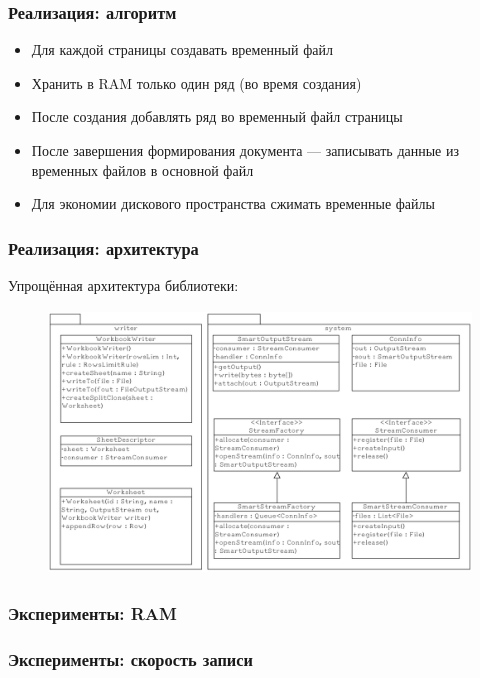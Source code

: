 \documentclass{beamer}
\begin{document}
\begin{frame}\frametitle{Реализация: алгоритм}
\begin{itemize}
    \item Для каждой страницы создавать временный файл
    \item Хранить в RAM только один ряд (во время создания)
    \item После создания добавлять ряд во временный файл страницы
    \item После завершения формирования документа --- записывать данные из временных файлов в основной файл
    \item Для экономии дискового пространства сжимать временные файлы
\end{itemize}
\end{frame}

\begin{frame}\frametitle{Реализация: архитектура}
Упрощённая архитектура библиотеки:
\begin{figure}
    \centering
    \includegraphics[height=7cm]{archsimple.png}
\end{figure}
\end{frame}

\begin{frame}\frametitle{Эксперименты: RAM}
\begin{figure}[h]
    \centering    
    \def\svgwidth{\columnwidth}
    
\end{figure}
\end{frame}

\begin{frame}\frametitle{Эксперименты: скорость записи}

\begin{figure}[h]
    \centering    
    \def\svgwidth{\columnwidth}
    
\end{figure}
\end{frame}
\end{document}
